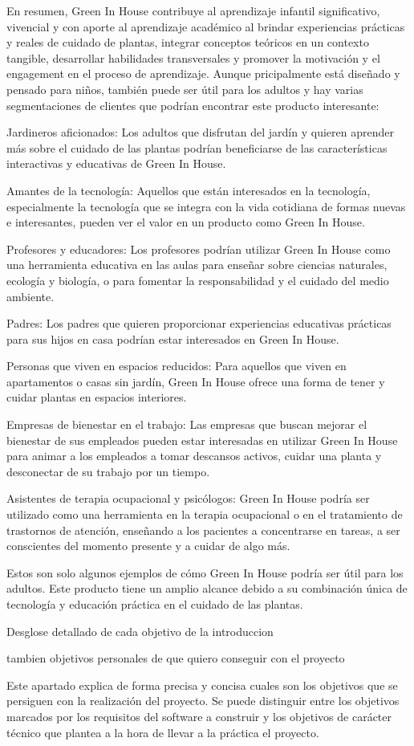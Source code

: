 En resumen, Green In House contribuye al aprendizaje infantil significativo, vivencial y con aporte al aprendizaje académico al brindar experiencias prácticas y reales de cuidado de plantas, integrar conceptos teóricos en un contexto tangible, desarrollar habilidades transversales y promover la motivación y el engagement en el proceso de aprendizaje. Aunque pricipalmente está diseñado y pensado para niños, también puede ser útil para los adultos y hay varias segmentaciones de clientes que podrían encontrar este producto interesante:

Jardineros aficionados: Los adultos que disfrutan del jardín y quieren aprender más sobre el cuidado de las plantas podrían beneficiarse de las características interactivas y educativas de Green In House.

Amantes de la tecnología: Aquellos que están interesados en la tecnología, especialmente la tecnología que se integra con la vida cotidiana de formas nuevas e interesantes, pueden ver el valor en un producto como Green In House.

Profesores y educadores: Los profesores podrían utilizar Green In House como una herramienta educativa en las aulas para enseñar sobre ciencias naturales, ecología y biología, o para fomentar la responsabilidad y el cuidado del medio ambiente.

Padres: Los padres que quieren proporcionar experiencias educativas prácticas para sus hijos en casa podrían estar interesados en Green In House.

Personas que viven en espacios reducidos: Para aquellos que viven en apartamentos o casas sin jardín, Green In House ofrece una forma de tener y cuidar plantas en espacios interiores.

Empresas de bienestar en el trabajo: Las empresas que buscan mejorar el bienestar de sus empleados pueden estar interesadas en utilizar Green In House para animar a los empleados a tomar descansos activos, cuidar una planta y desconectar de su trabajo por un tiempo.

Asistentes de terapia ocupacional y psicólogos: Green In House podría ser utilizado como una herramienta en la terapia ocupacional o en el tratamiento de trastornos de atención, enseñando a los pacientes a concentrarse en tareas, a ser conscientes del momento presente y a cuidar de algo más.

Estos son solo algunos ejemplos de cómo Green In House podría ser útil para los adultos. Este producto tiene un amplio alcance debido a su combinación única de tecnología y educación práctica en el cuidado de las plantas.






Desglose detallado de cada objetivo de la introduccion

tambien objetivos personales de que quiero conseguir con el proyecto


Este apartado explica de forma precisa y concisa cuales son los objetivos que se persiguen con la realización del proyecto. Se puede distinguir entre los objetivos marcados por los requisitos del software a construir y los objetivos de carácter técnico que plantea a la hora de llevar a la práctica el proyecto.
